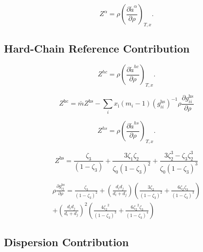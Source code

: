 \documentclass[12pt, letterpaper]{article}
\begin{document}
\begin{equation}
Z^\alpha =\rho\left(\frac{\partial\tilde{a}^\alpha}{\partial\rho}\right)_{T,x}
.\end{equation}

\subsection{Hard-Chain Reference Contribution}

\cite{Gross2001}

\begin{equation}
Z^{hc} =\rho\left(\frac{\partial\tilde{a}^{hc}}{\partial\rho}\right)_{T,x}
.\end{equation}

\begin{equation}
Z^\mathrm{hc}=\bar{m}Z^\mathrm{hs}-\sum_ix_\mathrm{i}(m_i-1)(g_{ii}^\mathrm{hs})^{-1}\rho\frac{\partial g_{ii}^\mathrm{hs}}{\partial\rho}
\end{equation}

\begin{equation}
Z^{hs} =\rho\left(\frac{\partial\tilde{a}^{hs}}{\partial\rho}\right)_{T,x}
.\end{equation}

\begin{equation}
Z^{\mathrm{hs}}=\frac{\zeta_{3}}{(1-\zeta_{3})}+\frac{3\zeta_{1}\zeta_{2}}{\zeta_{0}(1-\zeta_{3})^{2}}+\frac{3\zeta_{2}^{3}-\zeta_{3}\zeta_{2}^{3}}{\zeta_{0}(1-\zeta_{3})^{3}}
\end{equation}

\begin{equation}
\begin{aligned}
\rho\frac{\partial g_{ij}^{\mathrm{hs}}}{\partial\rho}=\frac{\zeta_{3}}{\left(1-\zeta_{3}\right)^{2}}+\left(\frac{d_{i}d_{j}}{d_{i}+d_{j}}\right)\left(\frac{3\zeta_{2}}{\left(1-\zeta_{3}\right)^{2}}+\frac{6\zeta_{2}\zeta_{3}}{\left(1-\zeta_{3}\right)^{3}}\right)\\+\left(\frac{d_{i}d_{j}}{d_{i}+d_{j}}\right)^{2}\left(\frac{4{\zeta_{2}}^{2}}{\left(1-{\zeta_{3}}\right)^{3}}+\frac{6{\zeta_{2}}^{2}\zeta_{3}}{\left(1-{\zeta_{3}}\right)^{4}}\right)
\end{aligned}
\end{equation}

\subsection{Dispersion Contribution}
\end{document}
